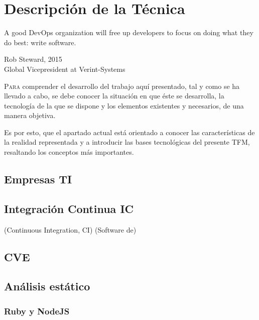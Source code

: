 \chapter{Descripción de la Técnica}\label{chp-02}
\epigraph{A good DevOps organization will free up developers to focus on doing what they do best: write software. }{Rob Steward, 2015\\Global Vicepresident at Verint-Systems}

\lettrine[lraise=-0.1, lines=2, loversize=0.2]{P}{ara} comprender el desarrollo del trabajo aquí presentado, tal y como se ha llevado a cabo, se debe conocer la situación en que éste se desarrolla, la tecnología de la que se dispone y los elementos existentes y necesarios, de una manera objetiva.

Es por esto, que el apartado actual está orientado a conocer las características de la realidad representada y a introducir las bases tecnológicas del presente \gls{TFM}, resaltando los conceptos más importantes.

\section{Empresas \gls{TI}}


\section{Integración Continua \gls{IC}}

(Continuous Integration, \gls{CI})
(Software de) 

\section{CVE}


\section{Análisis estático}



\subsection{Ruby y NodeJS}

